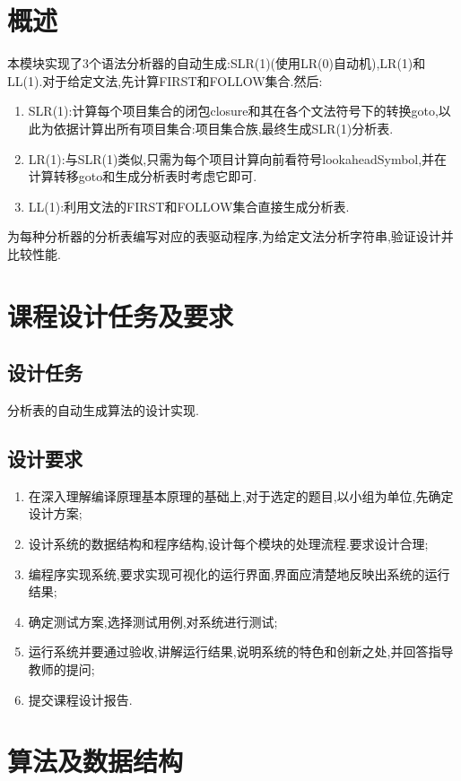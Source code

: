 \documentclass[11pt]{article}
\begin{document}
\newpage
\tableofcontents
\newpage

\section{概述}
本模块实现了3个语法分析器的自动生成:SLR(1)(使用LR(0)自动机),LR(1)和LL(1).对于给定文法,先计算FIRST和FOLLOW集合.然后:
\begin{enumerate}
\item SLR(1):计算每个项目集合的闭包closure和其在各个文法符号下的转换goto,以此为依据计算出所有项目集合:项目集合族,最终生成SLR(1)分析表.
\item LR(1):与SLR(1)类似,只需为每个项目计算向前看符号lookaheadSymbol,并在计算转移goto和生成分析表时考虑它即可.
\item LL(1):利用文法的FIRST和FOLLOW集合直接生成分析表.
\end{enumerate}

为每种分析器的分析表编写对应的表驱动程序,为给定文法分析字符串,验证设计并比较性能.

\section{课程设计任务及要求}
\subsection{设计任务}
分析表的自动生成算法的设计实现.
\subsection{设计要求}
\begin{enumerate}
\item 在深入理解编译原理基本原理的基础上,对于选定的题目,以小组为单位,先确定设计方案;
\item 设计系统的数据结构和程序结构,设计每个模块的处理流程.要求设计合理;
\item 编程序实现系统,要求实现可视化的运行界面,界面应清楚地反映出系统的运行结果;
\item 确定测试方案,选择测试用例,对系统进行测试;
\item 运行系统并要通过验收,讲解运行结果,说明系统的特色和创新之处,并回答指导教师的提问;
\item 提交课程设计报告.
\end{enumerate}

\section{算法及数据结构}
\end{document}
